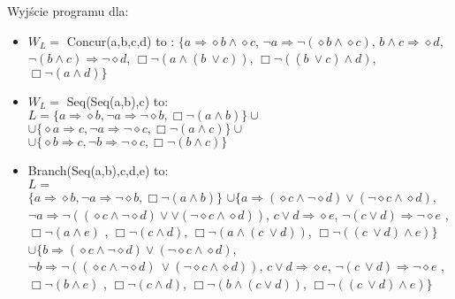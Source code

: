 \documentclass[a4paper, 11pt]{article}
\begin{document}
	Wyjście programu dla:
	\begin{itemize}
	\item $W_L= $ Concur(a,b,c,d) to :
	$\{ a   \Rightarrow     \diamond b   \wedge    \diamond c $,
		$	  \neg a   \Rightarrow     \neg (  \diamond b   \wedge    \diamond c)$,
			$ b   \wedge   c    \Rightarrow    \diamond d$,
			$  \neg (b   \wedge   c)    \Rightarrow     \neg   \diamond d$,
			$  \Box   \neg (a   \wedge   (b \  \vee   c))$,
			$  \Box   \neg ((b \  \vee   c)   \wedge   d)$,
			$  \Box   \neg (a   \wedge   d)\}$
	
	\item 	$W_L=$ Seq(Seq(a,b),c) to: \\
	$ L=\{  a \Rightarrow \diamond b , \neg a\Rightarrow \neg \diamond b, \Box \neg (a \wedge  b)\} \cup $ \\
	$ \cup \{\diamond a \Rightarrow c , \neg a\Rightarrow \neg \diamond c, \Box\neg (a \wedge  c)\} \cup $\\
	$ \cup \{\diamond b \Rightarrow c , \neg b\Rightarrow \neg \diamond c, \Box \neg (b \wedge  c)\} $
	
	\item Branch(Seq(a,b),c,d,e) to:\\
	$ L=$\\$ \{  a \Rightarrow \diamond b , \neg a\Rightarrow \neg \diamond b, \Box \neg (a \wedge  b)\} $ 
	$\cup 	\{	  a    \Rightarrow    ( \diamond c   \wedge    \neg   \diamond d)   \vee   ( \neg   \diamond c   \wedge    \diamond d)$,
			  $ \neg a    \Rightarrow     \neg (( \diamond c   \wedge    \neg   \diamond d)  \vee  \vee ( \neg   \diamond c   \wedge    \diamond d))$,
			 $ c  \vee d    \Rightarrow     \diamond e $,
			  $ \neg (c  \vee   d)    \Rightarrow    \neg   \diamond e$ ,
			   $\Box   \neg (a   \wedge   e)$ ,
			   $\Box   \neg (c   \wedge   d)$,
			   $\Box   \neg (a   \wedge   (c \  \vee   d))$,
			   $\Box   \neg ((c \  \vee   d)   \wedge   e)\} $			  
	$\cup 	\{	  b    \Rightarrow    ( \diamond c   \wedge    \neg   \diamond d)   \vee   ( \neg   \diamond c   \wedge    \diamond d)$,
			  $ \neg b    \Rightarrow     \neg (( \diamond c   \wedge    \neg   \diamond d) \  \vee   ( \neg   \diamond c   \wedge    \diamond d))$,
			 $ c  \vee   d    \Rightarrow     \diamond e $,
			  $ \neg (c \  \vee   d)    \Rightarrow    \neg   \diamond e$ ,
			   $\Box   \neg (b   \wedge   e)$ ,
			   $\Box   \neg (c   \wedge   d)$,
			   $\Box   \neg (b   \wedge   (c   \vee   d))$,
			   $\Box   \neg ((c \  \vee   d)   \wedge   e)\}$
			 		   		
	\end{itemize}
	
\end{document}

